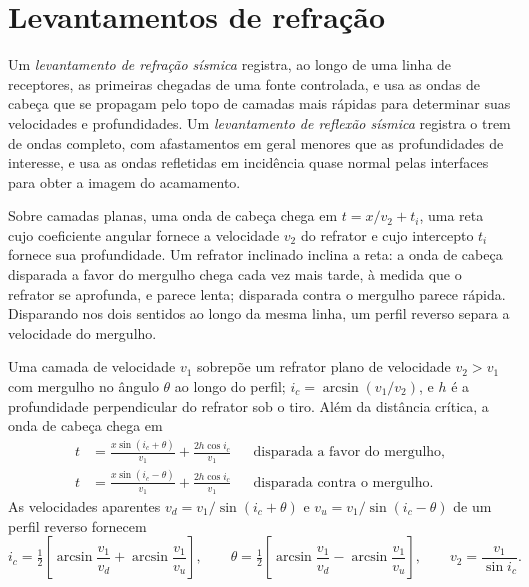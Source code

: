 \section{Levantamentos de refração}

\begin{definition}\label{def:b3:exploration-seismology:surveys}
Um \emph{levantamento de refração sísmica} registra, ao longo
de uma linha de receptores, as primeiras chegadas de uma fonte controlada, e usa as
ondas de cabeça que se propagam pelo topo de camadas mais rápidas para determinar suas velocidades e
profundidades. Um \emph{levantamento de reflexão sísmica}
registra o trem de ondas completo, com afastamentos em geral menores que as profundidades de
interesse, e usa as ondas refletidas em incidência quase normal pelas
interfaces para obter a imagem do acamamento.
\end{definition}

Sobre camadas planas, uma onda de cabeça chega em $t = x/v_2 + t_i$, uma reta
cujo coeficiente angular fornece a velocidade $v_2$ do refrator e cujo intercepto $t_i$
fornece sua profundidade. Um refrator inclinado inclina a reta: a onda de cabeça disparada
a favor do mergulho chega cada vez mais tarde, à medida que o refrator se aprofunda, e parece lenta;
disparada contra o mergulho parece rápida. Disparando nos dois sentidos ao longo da mesma linha, um perfil reverso
separa a velocidade do mergulho.

\begin{theorem}\label{thm:b3:exploration-seismology:dipping}
Uma camada de velocidade $v_1$ sobrepõe um refrator plano de velocidade $v_2 > v_1$ com mergulho
no ângulo $\theta$ ao longo do perfil; $i_c = \arcsin(v_1/v_2)$, e $h$ é a
profundidade perpendicular do refrator sob o tiro. Além da distância crítica,
a onda de cabeça chega em
\begin{align*}
  t &= \frac{x\sin(i_c + \theta)}{v_1} + \frac{2h\cos i_c}{v_1}
  &&\text{disparada a favor do mergulho},\\
  t &= \frac{x\sin(i_c - \theta)}{v_1} + \frac{2h\cos i_c}{v_1}
  &&\text{disparada contra o mergulho}.
\end{align*}
As velocidades aparentes $v_d = v_1/\sin(i_c + \theta)$ e
$v_u = v_1/\sin(i_c - \theta)$ de um perfil reverso fornecem
\[
  i_c = \tfrac12\left[\arcsin\frac{v_1}{v_d} + \arcsin\frac{v_1}{v_u}\right],\qquad
  \theta = \tfrac12\left[\arcsin\frac{v_1}{v_d} - \arcsin\frac{v_1}{v_u}\right],
  \qquad v_2 = \frac{v_1}{\sin i_c} .
\]
\end{theorem}

